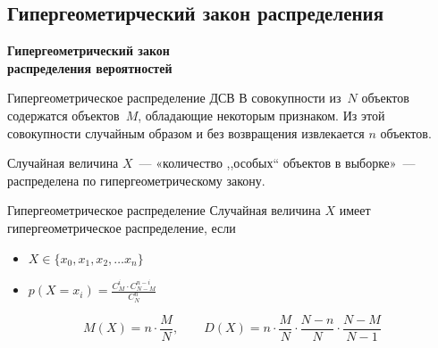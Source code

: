 \documentclass[unicode,11pt,notheorems,xcolor=table]{beamer}
\begin{document}
\subsection{Гипергеометирческий закон распределения}
\begin{frame}{}{}
    {\centering \bfseries \Large  Гипергеометрический закон\\ распределения вероятностей\par}
\end{frame}

\begin{frame}{Гипергеометрическое распределение ДСВ}{}
        В совокупности из~$N$ объектов содержатся  объектов~$M$, обладающие некоторым признаком. 
        Из этой совокупности случайным образом и без возвращения извлекается $n$ объектов. 
        
        Случайная величина $X$~--- «количество ,,особых`` объектов в выборке»~--- распределена по гипергеометрическому закону.
    \begin{block}{Гипергеометрическое распределение}
        Случайная величина $X$ имеет \alert{гипергеометрическое распределение}, если
        \begin{itemize}
            \item $X \in \{x_0,x_1,x_2,\ldots x_n\}$
            \item $ \displaystyle
        p(X=x_i) = \frac{C_M^i \cdot C_{N-M}^{n-i}}{C_N^n}
        $
        \end{itemize}
    \end{block}
    $$
    M(X)= n\cdot\frac{M}{N},
    \qquad 
    D(X)=n\cdot\frac{M}{N}\cdot \frac{N-n}{N}\cdot\frac{N-M}{N-1}
    $$
\end{frame}

\def \svin#1#2{
    \begin{tikzpicture}
        \begin{scope}
            \clip (0,-1.5) rectangle (1.5,1.5);
            \fill[opacity=0.3] (0,0)circle [radius=1.5cm];
        \end{scope}
        \draw[thick] (0,0)circle [radius=1.5cm];
        \draw[thick] (0,1.5) -- (0,-1.5);
        \draw[thick] (0,-0.5) ellipse [ x radius=1cm, y radius = 0.5cm];
        \draw 
            (-0.7,0.5) node{6}
            (0.7,0.5) node{4}
        ;
        \draw 
            (-0.4,-0.5) node{#1}
            (0.4,-0.5) node{#2}
        ;

    \end{tikzpicture}        
    }
\end{document}
